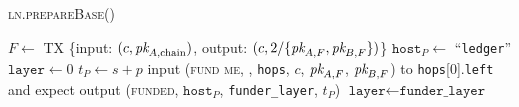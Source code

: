 \begin{center}
  \begin{processbox}{\textsc{ln.prepareBase}()}
    \begin{algorithmic}[1]
       
        \State $F \gets$ TX \{input: $(c, \textit{pk}_{A, \mathrm{chain}})$, output: $(c,
        2/\{\textit{pk}_{A, F}, \textit{pk}_{B, F}\})$\}
        \label{code:ln:base:create-funding}
        \State $\texttt{host}_P \gets$ ``\texttt{ledger}''
        \State $\texttt{layer} \gets 0$
        \State $t_P \gets s + p$
      \Else \: 
        \State input (\textsc{fund me}, \bob, \texttt{hops}, $c$, $\textit{pk}_{A, F}$,
        $\textit{pk}_{B, F}$) to \texttt{hops}[0].\texttt{left} and expect output
        (\textsc{funded}, $\texttt{host}_P$, \texttt{funder\_layer}, $t_P$)
        \label{code:ln:prepare-base:fund-me}
        \State $\texttt{layer} \gets \texttt{funder\_layer}$
      \EndIf
    \end{algorithmic}
  \end{processbox}
  \label{code:ln:prepare-base}
\end{center} \ \\


